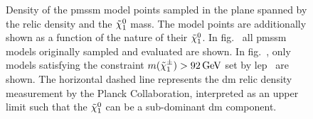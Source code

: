 \begin{figure}[h]
\begin{subfigure}[b]{0.49\linewidth}
	\end{subfigure}\hfill
	\caption{Density of the \gls{pmssm} model points sampled in the plane spanned by the relic density and the $\tilde{\chi}_1^0$ mass. The model points are additionally shown as a function of the nature of their $\tilde{\chi}_1^0$. In fig.~ all \gls{pmssm} models originally sampled and evaluated are shown. In fig.~, only models satisfying the constraint \mbox{$m(\charg) > \SI{92}{\GeV}$} set by \gls{lep}~\cite{lep_susy_results} are shown. The horizontal dashed line represents the \gls{dm} relic density measurement by the Planck Collaboration, interpreted as an upper limit such that the $\tilde{\chi}_1^0$ can be a sub-dominant \gls{dm} component.}
	\label{fig:relic_density_lsp_withConstraint}
\end{figure}
